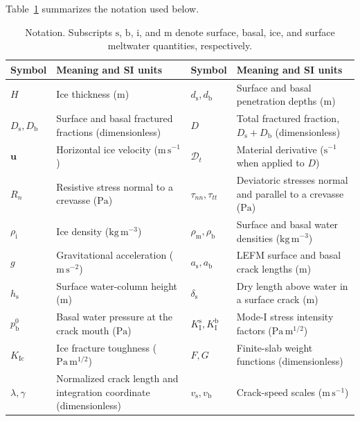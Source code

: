 \documentclass[11pt]{article}
\newcommand{\Dt}{\mathcal{D}_t}
\newcommand{\rmi}{\mathrm{i}}
\newcommand{\rms}{\mathrm{s}}
\newcommand{\rmb}{\mathrm{b}}
\newcommand{\KI}[1]{K_{\mathrm{I}}^{#1}}
\newcommand{\KIc}{K_{\mathrm{Ic}}}
\begin{document}
Table~\ref{tab:notation} summarizes the notation used below.
\begin{table}[htbp]
\centering
\small
\renewcommand{\arraystretch}{1.12}
\caption{Notation.  Subscripts \(\rms\), \(\rmb\), \(\rmi\), and
\(\mathrm{m}\) denote surface, basal, ice, and surface meltwater quantities,
respectively.}
\label{tab:notation}
\begin{tabular}{@{}>{\raggedright\arraybackslash}p{}
                    >{\raggedright\arraybackslash}p{}
                    >{\raggedright\arraybackslash}p{}
                    >{\raggedright\arraybackslash}p{}@{}}
\hline
Symbol & Meaning and SI units & Symbol & Meaning and SI units \\
\hline
\(H\) & Ice thickness (\(\mathrm{m}\)) &
\(d_{\rms},d_{\rmb}\) & Surface and basal penetration depths (\(\mathrm{m}\)) \\
\(D_{\rms},D_{\rmb}\) & Surface and basal fractured fractions (dimensionless) &
\(D\) & Total fractured fraction, \(D_{\rms}+D_{\rmb}\) (dimensionless) \\
\(\boldsymbol{u}\) & Horizontal ice velocity (\(\mathrm{m\,s^{-1}}\)) &
\(\Dt\) & Material derivative (\(\mathrm{s^{-1}}\) when applied to \(D\)) \\
\(R_n\) & Resistive stress normal to a crevasse (\(\mathrm{Pa}\)) &
\(\tau_{nn},\tau_{tt}\) & Deviatoric stresses normal and parallel to a crevasse (\(\mathrm{Pa}\)) \\
\(\rho_{\rmi}\) & Ice density (\(\mathrm{kg\,m^{-3}}\)) &
\(\rho_{\mathrm{m}},\rho_{\rmb}\) & Surface and basal water densities (\(\mathrm{kg\,m^{-3}}\)) \\
\(g\) & Gravitational acceleration (\(\mathrm{m\,s^{-2}}\)) &
\(a_{\rms},a_{\rmb}\) & LEFM surface and basal crack lengths (\(\mathrm{m}\)) \\
\(h_{\rms}\) & Surface water-column height (\(\mathrm{m}\)) &
\(\delta_{\rms}\) & Dry length above water in a surface crack (\(\mathrm{m}\)) \\
\(p_{\rmb}^{0}\) & Basal water pressure at the crack mouth (\(\mathrm{Pa}\)) &
\(\KI{\rms},\KI{\rmb}\) & Mode-I stress intensity factors (\(\mathrm{Pa\,m^{1/2}}\)) \\
\(\KIc\) & Ice fracture toughness (\(\mathrm{Pa\,m^{1/2}}\)) &
\(F,G\) & Finite-slab weight functions (dimensionless) \\
\(\lambda,\gamma\) & Normalized crack length and integration coordinate (dimensionless) &
\(v_{\rms},v_{\rmb}\) & Crack-speed scales (\(\mathrm{m\,s^{-1}}\)) \\

\end{tabular}
\end{table}
\end{document}
